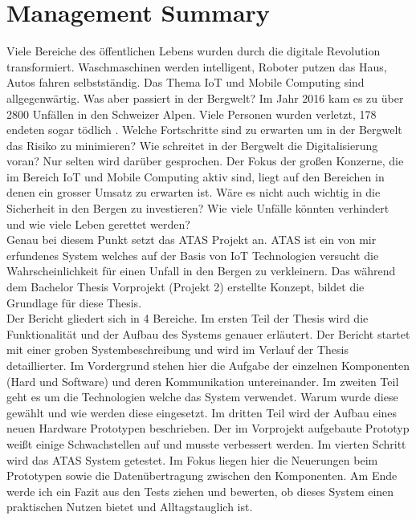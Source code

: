 \documentclass[11pt,english,german]{report}
\theoremstyle{definition}
\begin{document}
\tableofcontents






\chapter*{Management Summary}
Viele Bereiche des öffentlichen Lebens wurden durch die digitale Revolution transformiert. Waschmaschinen werden intelligent, Roboter putzen das Haus, Autos fahren selbstständig. Das Thema IoT und Mobile Computing sind allgegenwärtig. Was aber passiert in der Bergwelt? Im Jahr 2016 kam es zu über 2800 Unfällen in den Schweizer Alpen. Viele Personen wurden verletzt, 178 endeten sogar tödlich \cite{sacaccident}. Welche Fortschritte sind zu erwarten um in der Bergwelt das Risiko zu minimieren? Wie schreitet in der Bergwelt die Digitalisierung voran? Nur selten wird darüber gesprochen. Der Fokus der großen Konzerne, die im Bereich IoT und Mobile Computing aktiv sind, liegt auf den Bereichen in denen ein grosser Umsatz zu erwarten ist. Wäre es nicht auch wichtig in die Sicherheit in den Bergen zu investieren? Wie viele Unfälle könnten verhindert und wie viele Leben gerettet werden?\\[0.3cm]
Genau bei diesem Punkt setzt das \gls{ATAS} Projekt an. ATAS ist ein von mir erfundenes System welches auf der Basis von IoT Technologien versucht die Wahrscheinlichkeit für einen Unfall in den Bergen zu verkleinern. Das während dem Bachelor Thesis Vorprojekt (Projekt 2) erstellte Konzept, bildet die Grundlage für diese Thesis.\\[0.3cm] Der Bericht gliedert sich in 4 Bereiche. Im ersten Teil der Thesis wird die Funktionalität und der Aufbau des Systems genauer erläutert. Der Bericht startet mit einer groben Systembeschreibung und wird im Verlauf der Thesis detaillierter. Im Vordergrund stehen hier die Aufgabe der einzelnen Komponenten (Hard und Software) und deren Kommunikation untereinander. Im zweiten Teil geht es um die Technologien welche das System verwendet. Warum wurde diese gewählt und wie werden diese eingesetzt. Im dritten Teil wird der Aufbau eines neuen Hardware Prototypen beschrieben. Der im Vorprojekt aufgebaute Prototyp weißt einige Schwachstellen auf und musste verbessert werden. Im vierten Schritt wird das ATAS System getestet. Im Fokus liegen hier die Neuerungen beim Prototypen sowie die Datenübertragung zwischen den Komponenten. Am Ende werde ich ein Fazit aus den Tests ziehen und bewerten, ob dieses System einen praktischen Nutzen bietet und Alltagstauglich ist.
\end{document}
